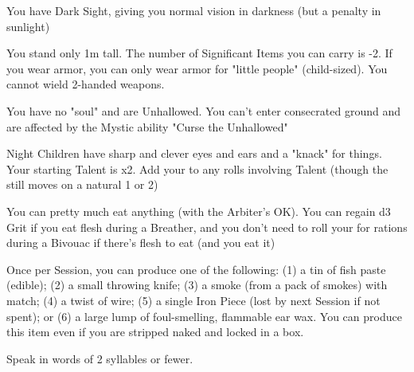 {  

  

  You have Dark Sight, giving you normal vision in darkness (but a penalty in sunlight)

  You stand only 1m tall.  The number of Significant Items you can carry is -2. If you wear armor, you can only wear armor for "little people" (child-sized).  You cannot wield 2-handed weapons.

  You have no "soul" and are Unhallowed. You can't enter consecrated ground and are affected by the Mystic ability "Curse the Unhallowed"

  Night Children have sharp and clever eyes and ears and a "knack" for things.  Your starting Talent is \DCUP x2.  Add your \LVL to any rolls involving Talent (though the \UD still moves \DCDOWN on a natural 1 or 2)


  You can pretty much eat anything (with the Arbiter's OK).  You can regain d3 Grit if you eat flesh during a Breather, and you don't need to roll your \UD for rations during a Bivouac if there's flesh to eat (and you eat it)

  Once per Session, you can produce one of the following:  (1) a tin of fish paste (edible); (2) a small throwing knife; (3) a smoke (from a pack of smokes) with match; (4) a twist of wire; (5) a single Iron Piece (lost by next Session if not spent); or (6) a large lump of foul-smelling, flammable ear wax.  You can produce this item even if you are stripped naked and locked in a box.

  Speak in words of 2 syllables or fewer.

}
